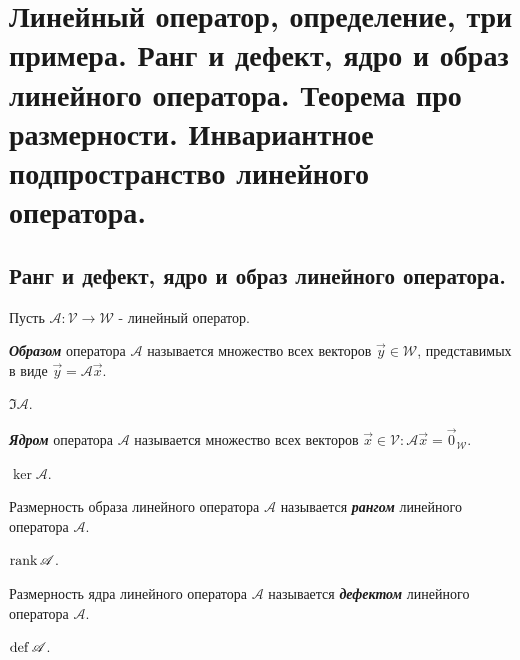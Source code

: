 \section{
    Линейный оператор, определение, три примера. Ранг и дефект, ядро и образ линейного оператора. Теорема про размерности. Инвариантное подпространство линейного оператора.  
}

\subsection{
    Ранг и дефект, ядро и образ линейного оператора.
}
Пусть $\mathscr{A} \colon \mathcal{V} \to \mathcal{W}$ - линейный оператор.

\begin{definition}
    \textbf{\textit{Образом}} оператора $\mathscr{A}$ называется множество всех векторов $\vec{y} \in \mathcal{W}$, представимых в виде $\vec{y} = \mathscr{A}\vec{x}$.
\end{definition}

\begin{designation}
    $\Im \mathscr{A}$.
\end{designation}

\begin{definition}
    \textbf{\textit{Ядром}} оператора $\mathscr{A}$ называется множество всех векторов $\vec{x} \in \mathcal{V} \colon \mathscr{A}\vec{x} = \vec{0}_{\mathcal{W}}$.
\end{definition}

\begin{designation}
    $\ker \mathscr{A}$.
\end{designation}

\begin{definition}
    Размерность образа линейного оператора $\mathscr{A}$ называется \textbf{\textit{рангом}} линейного оператора $\mathscr{A}$. 
\end{definition}

\begin{designation}
    $\operatorname{\mathop{\mathrm{rank}}} \mathscr{A}$.
\end{designation}

\begin{definition}
    Размерность ядра линейного оператора $\mathscr{A}$ называется \textbf{\textit{дефектом}} линейного оператора $\mathscr{A}$. 
\end{definition}

\begin{designation}
    $\operatorname{\mathop{\mathrm{def}}} \mathscr{A}$.
\end{designation}



